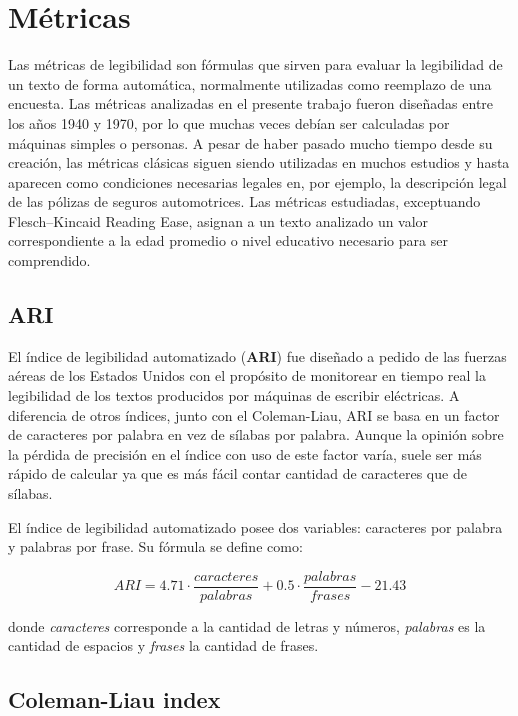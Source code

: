 \documentclass[12pt,journal,compsoc]{IEEEtran}
\begin{document}
\section{Métricas}\label{sec:metricas}

Las métricas de legibilidad son fórmulas que sirven para evaluar la legibilidad de un texto de forma automática, normalmente utilizadas como reemplazo de una encuesta. Las métricas analizadas en el presente trabajo fueron diseñadas entre los años 1940 y 1970, por lo que muchas veces debían ser calculadas por máquinas simples o personas. A pesar de haber pasado mucho tiempo desde su creación, las métricas clásicas siguen siendo utilizadas en muchos estudios y hasta aparecen como condiciones necesarias legales en, por ejemplo, la descripción legal de las pólizas de seguros automotrices\cite{mcclure}. Las métricas estudiadas, exceptuando Flesch–Kincaid Reading Ease, asignan a un texto analizado un valor correspondiente a la edad promedio o nivel educativo necesario para ser comprendido.

\subsection{ARI}

El índice de legibilidad automatizado (\textbf{ARI})\cite{ari-flesch} fue diseñado a pedido de las fuerzas aéreas de los Estados Unidos con el propósito de monitorear en tiempo real la legibilidad de los textos producidos por máquinas de escribir eléctricas. A diferencia de otros índices, junto con el Coleman-Liau, ARI se basa en un factor de caracteres por palabra en vez de sílabas por palabra. Aunque la opinión sobre la pérdida de precisión en el índice con uso de este factor varía, suele ser más rápido de calcular ya que es más fácil contar cantidad de caracteres que de sílabas\cite{liang}.

El índice de legibilidad automatizado posee dos variables: caracteres por palabra y palabras por frase. Su fórmula se define como:

$$ARI = 4.71\cdot \frac{caracteres}{palabras}+0.5\cdot \frac{palabras}{frases} - 21.43$$

donde \textit{caracteres} corresponde a la cantidad de letras y números, \textit{palabras} es la cantidad de espacios y \textit{frases} la cantidad de frases.

\subsection{Coleman-Liau index}
\end{document}
